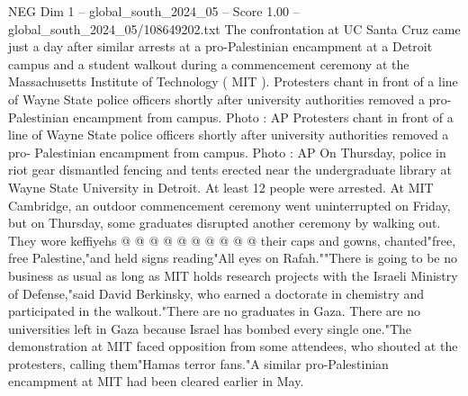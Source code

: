 \begin{textsample}{NEG Dim 1 – global\_south\_2024\_05 – Score 1.00 – global\_south\_2024\_05/108649202.txt}
The confrontation at UC Santa Cruz came just a day after similar arrests at a pro-Palestinian encampment at a Detroit campus and a student walkout during a commencement ceremony at the Massachusetts Institute of Technology ( MIT ).
Protesters chant in front of a line of Wayne State police officers shortly after university authorities removed a pro- Palestinian encampment from campus.
Photo : AP Protesters chant in front of a line of Wayne State police officers shortly after university authorities removed a pro- Palestinian encampment from campus.
Photo : AP On Thursday, police in riot gear dismantled fencing and tents erected near the undergraduate library at Wayne State University in Detroit.
At least 12 people were arrested.
At MIT Cambridge, an outdoor commencement ceremony went uninterrupted on Friday, but on Thursday, some graduates disrupted another ceremony by walking out.
They wore keffiyehs @ @ @ @ @ @ @ @ @ @ their caps and gowns, chanted"free, free Palestine,"and held signs reading"All eyes on Rafah.""There is going to be no business as usual as long as MIT holds research projects with the Israeli Ministry of Defense,"said David Berkinsky, who earned a doctorate in chemistry and participated in the walkout."There are no graduates in Gaza.
There are no universities left in Gaza because Israel has bombed every single one."The demonstration at MIT faced opposition from some attendees, who shouted at the protesters, calling them"Hamas terror fans."A similar pro-Palestinian encampment at MIT had been cleared earlier in May.

\end{textsample}
